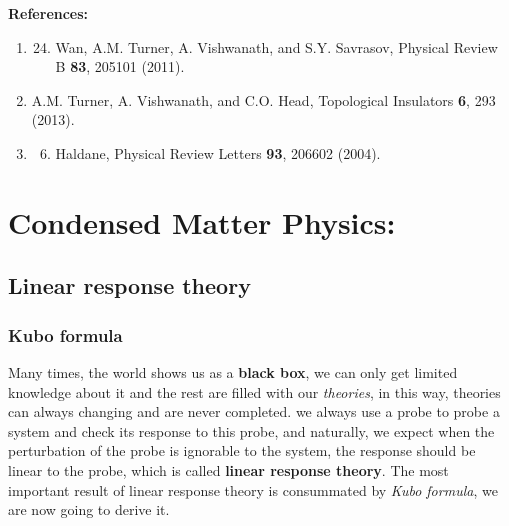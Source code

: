 \documentclass[letterpaper,10pt,english]{sphinxmanual}
\begin{document}
\textbf{References:}
\begin{enumerate}
\item {} \begin{enumerate}
\setcounter{enumi}{23}
\item {}
Wan, A.M. Turner, A. Vishwanath, and S.Y. Savrasov, Physical Review B \textbf{83}, 205101 (2011).

\end{enumerate}

\item {}
A.M. Turner, A. Vishwanath, and C.O. Head, Topological Insulators \textbf{6}, 293 (2013).

\item {} \begin{enumerate}
\setcounter{enumi}{5}
\item {}
Haldane, Physical Review Letters \textbf{93}, 206602 (2004).

\end{enumerate}

\end{enumerate}


\chapter{Condensed Matter Physics:}
\label{index:condensed-matter-physics}

\section{Linear response theory}
\label{CMP/linear response theory/main:id1}\label{CMP/linear response theory/main::doc}\label{CMP/linear response theory/main:linear-response-theory}

\subsection{Kubo formula}
\label{CMP/linear response theory/Kubo_formula:kubo-formula}\label{CMP/linear response theory/Kubo_formula::doc}\label{CMP/linear response theory/Kubo_formula:id1}
Many times, the world shows us as a \textbf{black box}, we can only get limited knowledge about it and the rest are filled with our \emph{theories}, in this way, theories can always changing and are never completed. we always use a probe to probe a system and check its response to this probe, and naturally, we expect when the perturbation of the probe is ignorable to the system, the response should be linear to the probe, which is called \textbf{linear response theory}. The most important result of linear response theory is consummated by \emph{Kubo formula}, we are now going to derive it.
\end{document}
